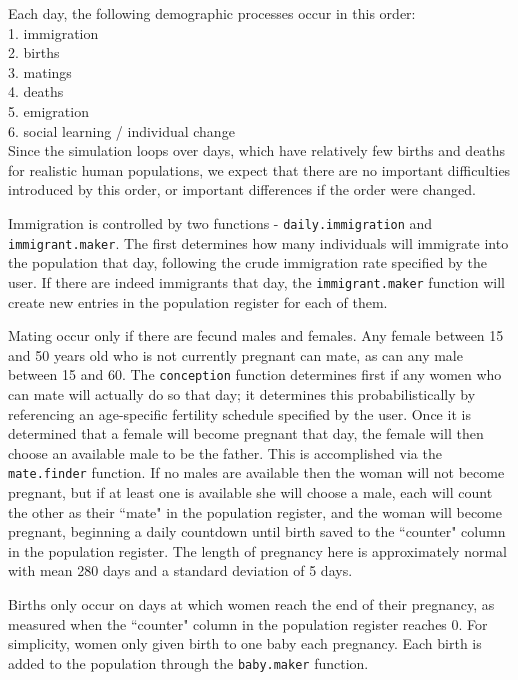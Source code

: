 \documentclass[11pt]{article}
\begin{document}
Each day, the following demographic processes occur in this order:\\
1.	immigration \\
2.	births\\
3.	matings\\
4.	deaths\\
5.	emigration\\
6.	social learning / individual change\\

Since the simulation loops over days, which have relatively few births and deaths for realistic human populations, we expect that there are no important difficulties introduced by this order, or important differences if the order were changed.  

Immigration is controlled by two functions - \texttt{daily.immigration} and \texttt{immigrant.maker}.  The first determines how many individuals will immigrate into the population that day, following the crude immigration rate specified by the user.  If there are indeed immigrants that day, the \texttt{immigrant.maker} function will create new entries in the population register for each of them. 

Mating occur only if there are fecund males and females.  Any female between 15 and 50 years old who is not currently pregnant can mate, as can any male between 15 and 60.  The \texttt{conception} function determines first if any women who can mate will actually do so that day; it determines this probabilistically by referencing an age-specific fertility schedule specified by the user.  Once it is determined that a female will become pregnant that day, the female will then choose an available male to be the father.  This is accomplished via the \texttt{mate.finder} function.  If no males are available then the woman will not become pregnant, but if at least one is available she will choose a male, each will count the other as their ``mate" in the population register, and the woman will become pregnant, beginning a daily countdown until birth saved to the ``counter" column in the population register.  The length of pregnancy here is approximately normal with mean 280 days and a standard deviation of 5 days.

Births only occur on days at which women reach the end of their pregnancy, as measured when the ``counter" column in the population register reaches 0.  For simplicity, women only given birth to one baby each pregnancy.  Each birth is added to the population through the \texttt{baby.maker} function.  
\end{document}
